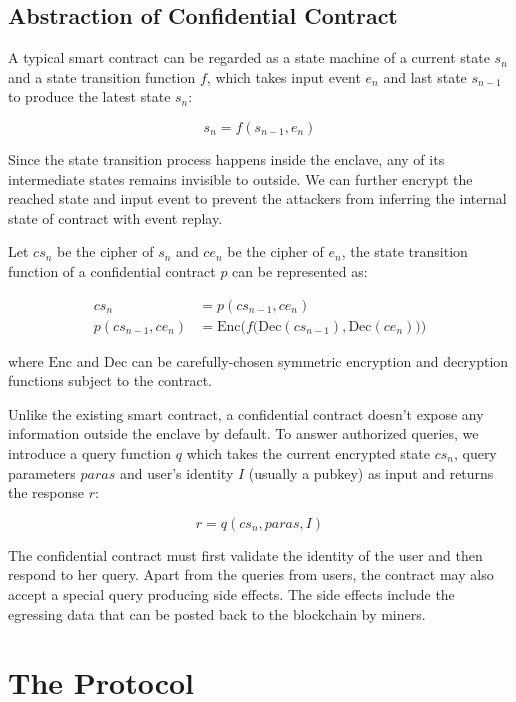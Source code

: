 \subsection{Abstraction of Confidential Contract}

A typical smart contract can be regarded as a state machine of a current state $s_n$ and a state transition function $f$, which takes input event $e_n$ and last state $s_{n-1}$ to produce the latest state $s_n$:

$$
    s_n = f(s_{n-1}, e_n)
$$

Since the state transition process happens inside the enclave, any of its intermediate states remains invisible to outside.
We can further encrypt the reached state and input event to prevent the attackers from inferring the internal state of contract with event replay.

Let $cs_n$ be the cipher of $s_n$ and $ce_n$ be the cipher of $e_n$, the state transition function of a confidential contract $p$ can be represented as:

\begin{align}
    cs_n              & = p(cs_{n-1}, ce_n)                                                             \\
    p(cs_{n-1}, ce_n) & = \mathrm{Enc}\bigg(f\big(\mathrm{Dec}(cs_{n-1}), \mathrm{Dec}(ce_n)\big)\bigg)
\end{align}

where $\mathrm{Enc}$ and $\mathrm{Dec}$ can be carefully-chosen symmetric encryption and decryption functions subject to the contract.

Unlike the existing smart contract, a confidential contract doesn't expose any information outside the enclave by default. To answer authorized queries, we introduce a query function $q$ which takes the current encrypted state $cs_n$, query parameters $paras$ and user's identity $I$ (usually a pubkey) as input and returns the response $r$:

$$
    r = q(cs_n, paras, I)
$$

The confidential contract must first validate the identity of the user and then respond to her query. Apart from the queries from users, the contract may also accept a special query producing side effects. The side effects include the egressing data that can be posted back to the blockchain by miners.

\section{The Protocol}

